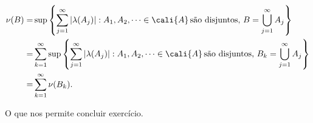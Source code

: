 \begin{homeworkProblem}[7]
\begin{solution}
\begin{enumerate}
        \begin{align*}
          \nu(B)=&\sup\left\{ \sum_{j=1}^{\infty}|\lambda(A_j)|:A_1,A_2,\cdots\in\cali{A}\,\text{são disjuntos, }B=\bigcup_{j=1}^{\infty}A_j \right\}\\
          =&\sum_{k=1}^{\infty}\sup\left\{ \sum_{j=1}^{\infty}|\lambda(A_j)|:A_1,A_2,\cdots\in\cali{A}\,\text{são disjuntos, }B_k=\bigcup_{j=1}^{\infty}A_j \right\}\\
          =&\sum_{k=1}^{\infty}\nu(B_k).
        \end{align*}
    \end{enumerate}
    O que nos permite concluir exercício.
  \end{solution}
\end{homeworkProblem}
